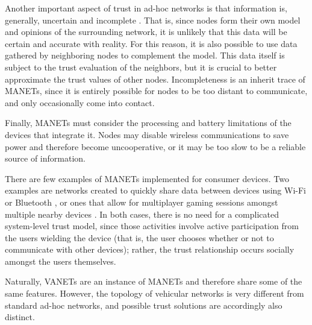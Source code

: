Another important aspect of trust in ad-hoc networks is that information is, generally, uncertain and incomplete \citep{baras2005cooperation}.
That is, since nodes form their own model and opinions of the surrounding network, it is unlikely that this data will be certain and accurate with reality.
For this reason, it is also possible to use data gathered by neighboring nodes to complement the model.
This data itself is subject to the trust evaluation of the neighbors, but it is crucial to better approximate the trust values of other nodes.
Incompleteness is an inherit trace of MANETs, since it is entirely possible for nodes to be too distant to communicate, and only occasionally come into contact.

Finally, MANETs must consider the processing and battery limitations of the devices that integrate it.
Nodes may disable wireless communications to save power and therefore become uncooperative, or it may be too slow to be a reliable source of information.

There are few examples of MANETs implemented for consumer devices.
Two examples are networks created to quickly share data between devices using Wi-Fi or Bluetooth \citep{krochmal2014discovery}, or ones that allow for multiplayer gaming sessions amongst multiple nearby devices \citep{sasaki2011wireless}.
In both cases, there is no need for a complicated system-level trust model, since those activities involve active participation from the users wielding the device (that is, the user chooses whether or not to communicate with other devices); rather, the trust relationship occurs socially amongst the users themselves.

Naturally, VANETs are an instance of MANETs and therefore share some of the same features.
However, the topology of vehicular networks is very different from standard ad-hoc networks, and possible trust solutions are accordingly also distinct.

